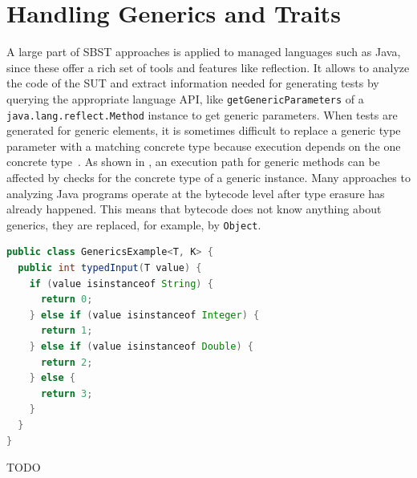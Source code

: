 \documentclass[paper=a4,%
  twoside,%
  BCOR4mm,%
  abstract=true,%
  toc=bibliography,%
  chapterprefix=true,%
  toc=bibliographynumbered,%
  open=right,%
  english,%
  pagesize=pdftex]{scrreprt}
\begin{document}




\section{Handling Generics and Traits}
A large part of \ac{SBST} approaches is applied to managed languages such as Java, since these offer a rich set of tools and features like reflection. It allows to analyze the code of the \ac{SUT} and extract information needed for generating tests by querying the appropriate language \ac{API}, like \lstinline{getGenericParameters} of a \lstinline{java.lang.reflect.Method} instance to get generic parameters. When tests are generated for generic elements, it is sometimes difficult to replace a generic type parameter with a matching concrete type because execution depends on the one concrete type~\cite{Fraser2014b}. As shown in , an execution path for generic methods can be affected by checks for the concrete type of a generic instance. Many approaches to analyzing Java programs operate at the bytecode level after type erasure has already happened. This means that bytecode does not know anything about generics, they are replaced, for example, by \lstinline{Object}.

\begin{lstlisting}[language=Java, style=boxed, caption={The execution path of the generic Java method depends on the concrete type of the argument}, label=lst:java-isinstanceof]
public class GenericsExample<T, K> {
  public int typedInput(T value) {
    if (value isinstanceof String) {
      return 0;
    } else if (value isinstanceof Integer) {
      return 1;
    } else if (value isinstanceof Double) {
      return 2;
    } else {
      return 3;
    }
  }
}
\end{lstlisting}

TODO
\end{document}
